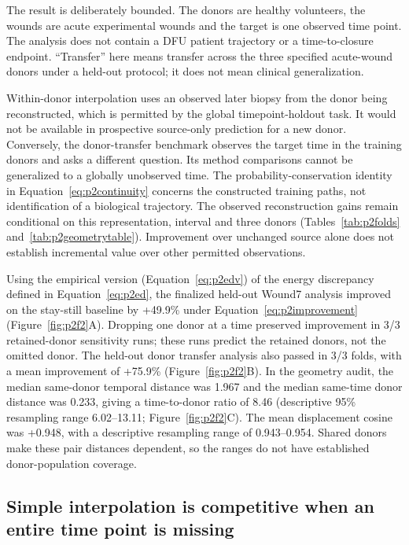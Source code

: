\documentclass[10pt,a4paper]{article}
\begin{document}
The result is deliberately bounded. The donors are healthy volunteers, the wounds are acute experimental wounds and the target is one observed time point. The analysis does not contain a DFU patient trajectory or a time-to-closure endpoint. ``Transfer'' here means transfer across the three specified acute-wound donors under a held-out protocol; it does not mean clinical generalization.

Within-donor interpolation uses an observed later biopsy from the donor being reconstructed, which is permitted by the global timepoint-holdout task. It would not be available in prospective source-only prediction for a new donor. Conversely, the donor-transfer benchmark observes the target time in the training donors and asks a different question. Its method comparisons cannot be generalized to a globally unobserved time. The probability-conservation identity in Equation~\eqref{eq:p2continuity} concerns the constructed training paths, not identification of a biological trajectory. The observed reconstruction gains remain conditional on this representation, interval and three donors (Tables~\ref{tab:p2folds} and~\ref{tab:p2geometrytable}). Improvement over unchanged source alone does not establish incremental value over other permitted observations.

\FloatBarrier
Using the empirical version (Equation~\eqref{eq:p2edv}) of the energy discrepancy defined in Equation~\eqref{eq:p2ed}, the finalized held-out Wound7 analysis improved on the stay-still baseline by +49.9\% under Equation~\eqref{eq:p2improvement} (Figure~\ref{fig:p2f2}A\label{call:p2f2}). Dropping one donor at a time preserved improvement in 3/3 retained-donor sensitivity runs; these runs predict the retained donors, not the omitted donor. The held-out donor transfer analysis also passed in 3/3 folds, with a mean improvement of +75.9\% (Figure~\ref{fig:p2f2}B). In the geometry audit, the median same-donor temporal distance was 1.967 and the median same-time donor distance was 0.233, giving a time-to-donor ratio of 8.46 (descriptive 95\% resampling range 6.02--13.11; Figure~\ref{fig:p2f2}C). The mean displacement cosine was +0.948, with a descriptive resampling range of 0.943--0.954. Shared donors make these pair distances dependent, so the ranges do not have established donor-population coverage.




\subsection{Simple interpolation is competitive when an entire time point is missing}
\end{document}
